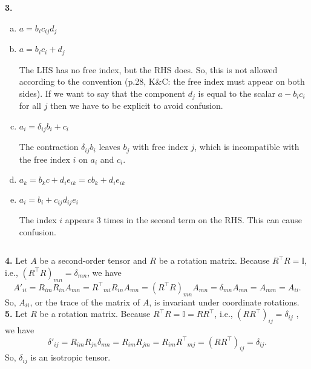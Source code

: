 \documentclass[11pt]{article}
\newcommand{\cmark}{\ding{51}}%
\newcommand{\xmark}{\ding{55}}%
\begin{document}
\noindent \textbf{3.} 
\begin{enumerate}[(a)]
	\item $a = b_i c_{ij} d_j$ \cmark 
	\item $a = b_i c_i  + d_j$ \xmark 
	
	The LHS has no free index, but the RHS does. So, this is not allowed according to the convention (p.28, K\&C: the free index must appear on both sides). If we want to say that the component $d_j$ is equal to the scalar $a - b_i c_i$ for all $j$ then we have to be explicit to avoid confusion. 
	
	\item $a_i = \delta_{ij} b_i + c_i$ \xmark  
	
	The contraction $\delta_{ij}b_i$ leaves $b_j$ with free index $j$, which is incompatible with the free index $i$ on $a_i$ and $c_i$. 
	
	\item $a_k = b_k c + d_i e_{ik} = cb_k +  d_i e_{ik}$ \cmark 
	\item $a_i = b_i + c_{ij} d_{ij} e_i$ \xmark 
	
	The index $i$ appears 3 times in the second term on the RHS. This can cause confusion.
\end{enumerate}
$\,$


\noindent \textbf{4.} Let $A$ be a second-order tensor and $R$ be a rotation matrix. Because $R^\top R = \mathbb{I}$, i.e., $(R^\top R)_{mn} = \delta_{mn}$, we have 
\begin{equation*}
A'_{ii} = R_{im}R_{in}A_{mn} = {R^\top}_{mi}R_{in} A_{mn} = (R^\top R)_{mn}A_{mn} = \delta_{mn}A_{mn} = A_{mm} = A_{ii}.
\end{equation*}
So, $A_{ii}$, or the trace of the matrix of $A$, is invariant under coordinate rotations. \\


\noindent \textbf{5.} Let $R$ be a rotation matrix. Because $R^\top R = \mathbb{I} = RR^\top$, i.e., $(RR^\top)_{ij} = \delta_{ij}$ , we have
\begin{equation*}
\delta'_{ij} = R_{im}R_{jn} \delta_{mn} = R_{im} R_{jm} = R_{im} {R^\top}_{mj} = (RR^\top)_{ij} = \delta_{ij}.
\end{equation*}
So, $\delta_{ij}$ is an isotropic tensor. 
\end{document}
